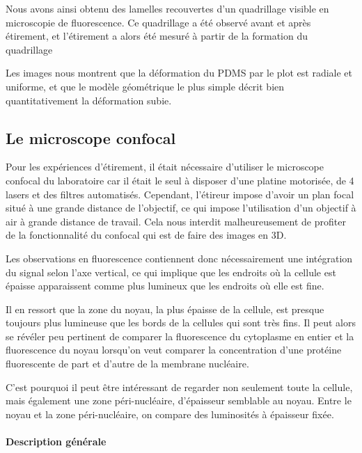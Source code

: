 \documentclass{report}
\begin{document}
	Nous avons ainsi obtenu des lamelles recouvertes d'un quadrillage visible en microscopie de fluorescence. Ce quadrillage a été observé avant et après étirement, et l'étirement a alors été mesuré à partir de la formation du quadrillage
	
	Les images nous montrent que la déformation du PDMS par le plot est radiale et uniforme, et que le modèle géométrique le plus simple décrit bien quantitativement la déformation subie. 
	
	\subsection{Le microscope confocal}
	
	Pour les expériences d'étirement, il était nécessaire d'utiliser le microscope confocal du laboratoire car il était le seul à disposer d'une platine motorisée, de 4 lasers et des filtres automatisés. Cependant, l'étireur impose d'avoir un plan focal situé à une grande distance de l'objectif, ce qui impose l'utilisation d'un objectif à air à grande distance de travail. Cela nous interdit malheureusement de profiter de la fonctionnalité du confocal qui est de faire des images en 3D. 
	
	Les observations en fluorescence contiennent donc nécessairement une intégration du signal selon l'axe vertical, ce qui implique que les endroits où la cellule est épaisse apparaissent comme plus lumineux que les endroits où elle est fine. 
	
	Il en ressort que la zone du noyau, la plus épaisse de la cellule, est presque toujours plus lumineuse que les bords de la cellules qui sont très fins. 
	Il peut alors se révéler peu pertinent de comparer la fluorescence du cytoplasme en entier et la fluorescence du noyau lorsqu'on veut comparer la concentration d'une protéine fluorescente de part et d'autre de la membrane nucléaire.
	
	C'est pourquoi il peut être intéressant de regarder non seulement toute la cellule, mais également une zone péri-nucléaire, d'épaisseur semblable au noyau. Entre le noyau et la zone péri-nucléaire, on compare des luminosités à épaisseur fixée.
	
	\paragraph{Description générale}
	
\end{document}
